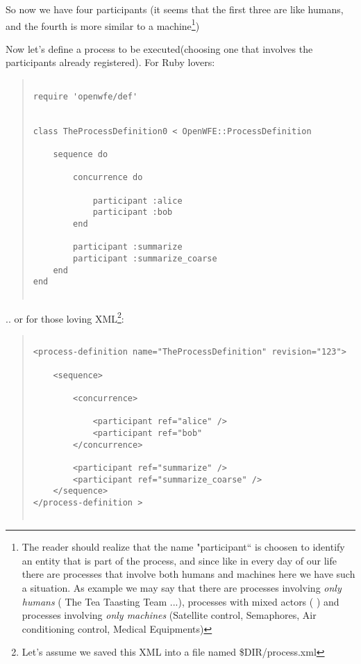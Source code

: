         So now we have four participants (it seems that the first three are like humans, 
        and the fourth is more similar to a machine\footnote{The reader should 
        realize that the name "participant`` is choosen to identify an entity that is
        part of the process, and since like in every day of our life there are processes
        that involve both humans and machines here we have such a situation. As example we 
        may say that there are processes involving \emph{only humans}  ( The Tea Taasting 
        Team ...), processes with mixed actors ( ) and processes involving \emph{only machines}
        (Satellite control, Semaphores, Air conditioning control, Medical Equipments)
        
        })

        Now let's define a process to be executed(choosing one that involves the 
        participants already registered). For Ruby lovers:

        \begin{quote}
        \begin{verbatim}

require 'openwfe/def'


class TheProcessDefinition0 < OpenWFE::ProcessDefinition

    sequence do

        concurrence do

            participant :alice
            participant :bob
        end

        participant :summarize
        participant :summarize_coarse
    end
end


        \end{verbatim}
        \end{quote}

        .. or for those loving XML\footnote{Let's assume we saved this XML into a file named \$DIR/process.xml}:

        \begin{quote}
        \begin{verbatim}

<process-definition name="TheProcessDefinition" revision="123">

    <sequence>

        <concurrence>

            <participant ref="alice" />
            <participant ref="bob"
        </concurrence>

        <participant ref="summarize" />
        <participant ref="summarize_coarse" />
    </sequence>
</process-definition >


        \end{verbatim}
        \end{quote}


